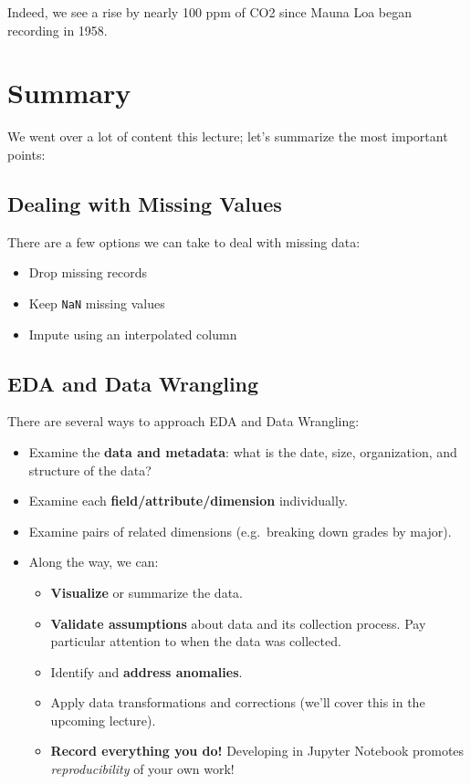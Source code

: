 \documentclass[
  letterpaper,
  DIV=11,
  numbers=noendperiod]{scrreprt}
\providecommand{\tightlist}{%
  \setlength{\itemsep}{0pt}\setlength{\parskip}{0pt}}\usepackage{longtable,booktabs,array}
\begin{document}
Indeed, we see a rise by nearly 100 ppm of CO2 since Mauna Loa began
recording in 1958.

\section{Summary}\label{summary}

We went over a lot of content this lecture; let's summarize the most
important points:

\subsection{Dealing with Missing
Values}\label{dealing-with-missing-values}

There are a few options we can take to deal with missing data:

\begin{itemize}
\tightlist
\item
  Drop missing records
\item
  Keep \texttt{NaN} missing values
\item
  Impute using an interpolated column
\end{itemize}

\subsection{EDA and Data Wrangling}\label{eda-and-data-wrangling}

There are several ways to approach EDA and Data Wrangling:

\begin{itemize}
\tightlist
\item
  Examine the \textbf{data and metadata}: what is the date, size,
  organization, and structure of the data?
\item
  Examine each \textbf{field/attribute/dimension} individually.
\item
  Examine pairs of related dimensions (e.g.~breaking down grades by
  major).
\item
  Along the way, we can:

  \begin{itemize}
  \tightlist
  \item
    \textbf{Visualize} or summarize the data.
  \item
    \textbf{Validate assumptions} about data and its collection process.
    Pay particular attention to when the data was collected.
  \item
    Identify and \textbf{address anomalies}.
  \item
    Apply data transformations and corrections (we'll cover this in the
    upcoming lecture).
  \item
    \textbf{Record everything you do!} Developing in Jupyter Notebook
    promotes \emph{reproducibility} of your own work!
  \end{itemize}
\end{itemize}
\end{document}
